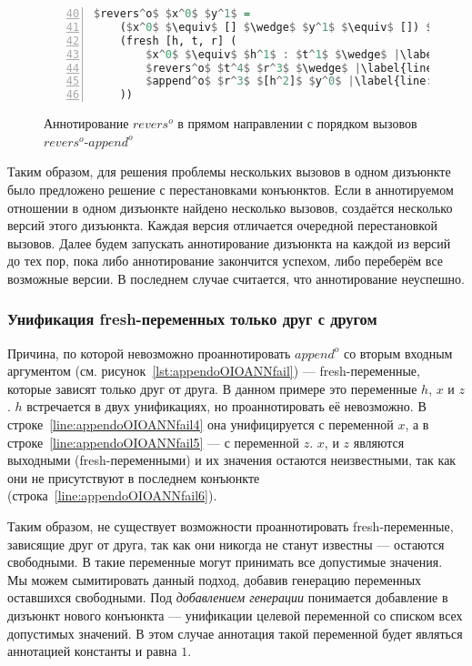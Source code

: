 \begin{figure}[h!]
  \begin{center}
  \begin{minipage}{0.4\textwidth}
  \begin{lstlisting}[language=Haskell, frame=single, numbers=left,numberstyle=\small, firstnumber=40, escapechar=|]
  $revers^o$ $x^0$ $y^1$ =
    ($x^0$ $\equiv$ [] $\wedge$ $y^1$ $\equiv$ []) $\vee$ |\label{line:reversoIOANN2}|
    (fresh [h, t, r] (
        $x^0$ $\equiv$ $h^1$ : $t^1$ $\wedge$ |\label{line:reversoIOANN4}|
        $revers^o$ $t^4$ $r^3$ $\wedge$ |\label{line:reversoIOANN5}|
        $append^o$ $r^3$ $[h^2]$ $y^0$ |\label{line:reversoIOANN6}|
    ))
    \end{lstlisting}
  \end{minipage}
  \end{center}
  \caption{Аннотирование $revers^o$ в прямом направлении с порядком вызовов $revers^o$-$append^o$}
  \label{lst:reversoIOANN}
\end{figure}

Таким образом, для решения проблемы нескольких вызовов в одном дизъюнкте было предложено решение с перестановками конъюнктов.
Если в аннотируемом отношении в одном дизъюнкте найдено несколько вызовов, создаётся несколько версий этого дизъюнкта.
Каждая версия отличается очередной перестановкой вызовов.
Далее будем запускать аннотирование дизъюнкта на каждой из версий до тех пор, пока либо аннотирование закончится успехом, либо переберём все возможные версии.
В последнем случае считается, что аннотирование неуспешно.

\subsubsection{Унификация fresh-переменных только друг с другом}

Причина, по которой невозможно проаннотировать $append^o$ со вторым входным аргументом (см. рисунок~\ref{lst:appendoOIOANNfail}) --- fresh-переменные, которые зависят только друг от друга.
В данном примере это переменные $h$, $x$ и $z$.
$h$ встречается в двух унификациях, но проаннотировать её невозможно.
В строке~\ref{line:appendoOIOANNfail4} она унифицируется с переменной $x$, а в строке~\ref{line:appendoOIOANNfail5} --- с переменной $z$.
$x$, и $z$ являются выходными (fresh-переменными) и их значения остаются неизвестными, так как они не присутствуют в последнем конъюнкте (строка~\ref{line:appendoOIOANNfail6}).

Таким образом, не существует возможности проаннотировать fresh-переменные, зависящие друг от друга, так как они никогда не станут известны --- остаются свободными.
В \miniKanren{} такие переменные могут принимать все допустимые значения.
Мы можем сымитировать данный подход, добавив генерацию переменных оставшихся свободными.
Под \emph{добавлением генерации} понимается добавление в дизъюнкт нового конъюнкта --- унификации целевой переменной со списком всех допустимых значений.
В этом случае аннотация такой переменной будет являться аннотацией константы и равна $1$.

